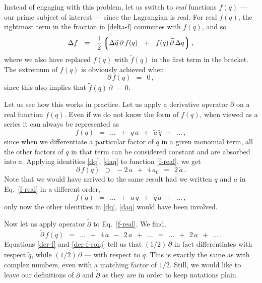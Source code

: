 \documentclass[epsfig,12pt]{article}
\newcommand{\p}{\partial}
\newcommand{\wt}{\widetilde}
\newcommand{\lgr}{\left\lgroup}
\newcommand{\rgr}{\right\rgroup}
\begin{document}
	Instead of engaging with this problem, let us switch to \emph{real} functions $ f(q) $ ---
	our prime subject of interest --- since the Lagrangian is real.
	For real $ f(q) $, the rightmost term in the fraction in \eqref{delta-f} commutes with $ f(q) $,
	and so
\[
	\Delta f	~~=~~	\frac 1 2 \lgr \Delta \wt q\, \p\, f(q)  ~~+~~  f(q)\, \wt \p\, \Delta q \rgr,
\]
	where we also have replaced $ f(q) $ with $ \wt f(q) $ in the first term in the bracket.
	The extremum of $ f(q) $ is obviously achieved when
\begin{equation}
	\p\,f(q)	~~=~~	0\,,
\end{equation}
	since this also implies that $ \wt f(q)\, \wt \p ~=~ 0 $.

	Let us see how this works in practice.
	Let us apply a derivative operator $ \p $ on a real function $ f(q) $.
	Even if we do not know the form of $ f(q) $, when viewed as a series it can always be represented as
\begin{equation}
\label{f-real}
	f(q)		~~=~~	\dots  ~~+~~  q\,a  ~~+~~  \wt a\, \wt q  ~~+~~  \dots\,,
\end{equation}
	since when we differentiate a particular factor of $ q $ in a given monomial term,
	all the other factors of $ q $ in that term can be considered constant and are absorbed into $ a $.
	Applying identities \eqref{dq}, \eqref{daq} to function \eqref{f-real}, we get
\begin{equation}
\label{der-f}
	\p\, f(q)	~~\supset~~	-2\,a  ~~+~~  4\,a_0	~~=~~	2\,\wt a\,.
\end{equation}
	Note that we would have arrived to the same result had we written $ q $ and $ a $ in Eq.~\eqref{f-real}
	in a different order,
\begin{equation}
	f(q)		~~=~~	\dots  ~~+~~  a\,q  ~~+~~  \wt q\, \wt a  ~~+~~  \dots\,,
\end{equation}
	only now the other identities in \eqref{dq}, \eqref{daq} would have been involved.

	Now let us apply operator $ \wt\p $ to Eq.~\eqref{f-real}.
	We find,
\begin{equation}
\label{der-f-conj}
	\wt \p\, f(q)	~~=~~	\dots  ~~+~~  4\,a  ~~-~~  2\,a  ~~+~~  \dots	
			~~=~~	\dots  ~~+~~  2\,a  ~~+~~  \dots\,.
\end{equation}
	Equations \eqref{der-f} and \eqref{der-f-conj} tell us that $ (1/2)\,\p $ in fact differentiates
	with respect $ \wt q $, while $ (1/2)\,\wt \p $ --- with respect to $ q $.
	This is exactly the same as with complex numbers, even with a matching factor of $ 1/2 $.
	Still, we would like to leave our definitions of $ \p $ and $ \wt \p $ as they are
	in order to keep notations plain.
\end{document}
